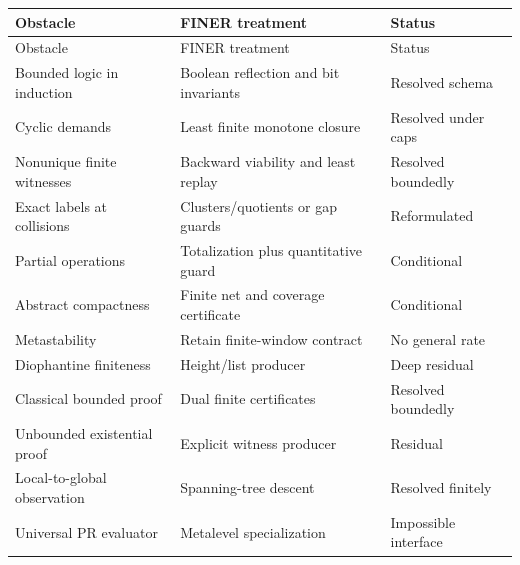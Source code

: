 \begin{longtable}{@{}p{}p{}p{}@{}}
\toprule
Obstacle & FINER treatment & Status \\
\midrule
\endfirsthead
\toprule
Obstacle & FINER treatment & Status \\
\midrule
\endhead
Bounded logic in induction & Boolean reflection and bit invariants & Resolved schema \\
Cyclic demands & Least finite monotone closure & Resolved under caps \\
Nonunique finite witnesses & Backward viability and least replay & Resolved boundedly \\
Exact labels at collisions & Clusters/quotients or gap guards & Reformulated \\
Partial operations & Totalization plus quantitative guard & Conditional \\
Abstract compactness & Finite net and coverage certificate & Conditional \\
Metastability & Retain finite-window contract & No general rate \\
Diophantine finiteness & Height/list producer & Deep residual \\
Classical bounded proof & Dual finite certificates & Resolved boundedly \\
Unbounded existential proof & Explicit witness producer & Residual \\
Local-to-global observation & Spanning-tree descent & Resolved finitely \\
Universal PR evaluator & Metalevel specialization & Impossible interface \\
\bottomrule
\end{longtable}
